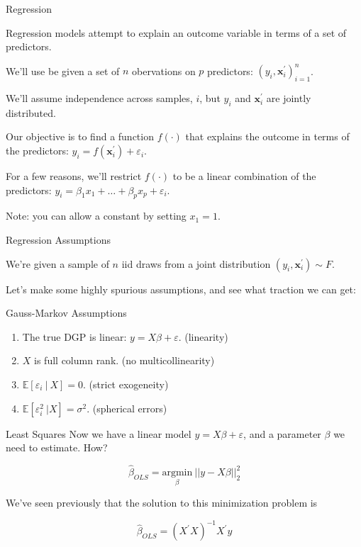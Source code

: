 \documentclass[11pt, xcolor={dvipsnames}, hyperref={colorlinks, allcolors=Blue}]{beamer}
\newcommand{\E}{\mathbb{E}}
\renewcommand{\epsilon}{\varepsilon}
\begin{document}
\begin{frame}{Regression}

Regression models attempt to explain an outcome variable in terms of a set of predictors. \bigskip

We'll use be given a set of $n$ obervations on $p$ predictors:  $(y_{i}, \mathbf{x}_{i}^{\prime})_{i=1}^{n}$.\bigskip

We'll assume independence across samples, $i$, but $y_{i}$ and $\mathbf{x}_{i}^{\prime}$ are jointly distributed.\bigskip

Our objective is to find a function $f(\cdot)$ that explains the outcome in terms of the predictors: $y_{i} = f(\mathbf{x}_{i}^{\prime}) + \epsilon_{i}$.\bigskip

For a few reasons, we'll restrict $f(\cdot)$ to be a linear combination of the predictors: $y_{i} = \beta_{1}x_{1} + \dots + \beta_{p} x_{p} + \epsilon_{i}$.\bigskip

Note: you can allow a constant by setting $x_{1} = 1$.
\end{frame}
\begin{frame}{Regression Assumptions}

We're given a sample of $n$ iid draws from a joint distribution $(y_{i}, \mathbf{x}_{i}^{\prime}) \sim F$.\bigskip

Let's make some highly spurious assumptions, and see what traction we can get:

\begin{block}{Gauss-Markov Assumptions}
\begin{enumerate}
	\item The true DGP is linear: $y = X\beta + \epsilon$. (linearity)
	\item $X$ is full column rank. (no multicollinearity)
	\item $\E[\epsilon_{i} \ | \ X] = 0$. (strict exogeneity)
	\item $\E[\epsilon_{i}^{2} \ | X] = \sigma^{2}$. (spherical errors)

\end{enumerate}
\end{block}

\end{frame}
\begin{frame}{Least Squares}
Now we have a linear model $y = X\beta + \epsilon$, and a parameter $\beta$ we need to estimate. How?\bigskip

\[\hat{\beta}_{OLS} = \underset{\beta}{\text{argmin}} \ ||y - X\beta||_{2}^{2}\]
\bigskip

We've seen previously that the solution to this minimization problem is 

\[\hat{\beta}_{OLS} = (X^{\prime}X)^{-1}X^{\prime}y\]

\end{frame}
\end{document}

